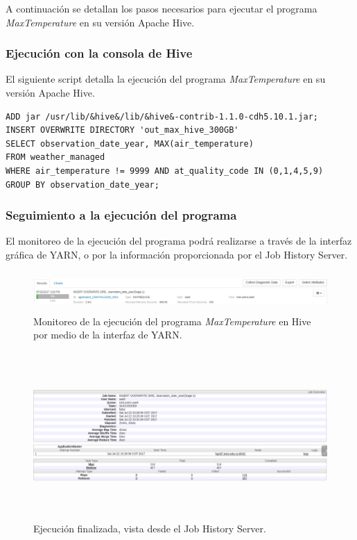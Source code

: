 A continuación se detallan los pasos necesarios para ejecutar el programa \textit{MaxTemperature} en su versión Apache Hive. \\

\subsubsection{Ejecución con la consola de Hive}

El siguiente script detalla la ejecución del programa \textit{MaxTemperature} en su versión Apache Hive.

\begin{lstlisting}[linewidth=\columnwidth,breaklines=true]
ADD jar /usr/lib/&hive&/lib/&hive&-contrib-1.1.0-cdh5.10.1.jar; 
INSERT OVERWRITE DIRECTORY 'out_max_hive_300GB' 
SELECT observation_date_year, MAX(air_temperature) 
FROM weather_managed 
WHERE air_temperature != 9999 AND at_quality_code IN (0,1,4,5,9) 
GROUP BY observation_date_year;
\end{lstlisting} 

\subsubsection{Seguimiento a la ejecución del programa}

El monitoreo de la ejecución del programa podrá realizarse a través de la interfaz gráfica de YARN, o por la información proporcionada por el Job History Server.

\begin{figure}[H]
  \centering
      \includegraphics[width=\textwidth, height=0.6in]{fig/04/06}
  \caption{Monitoreo de la ejecución del programa \textit{MaxTemperature} en Hive por medio de la interfaz de YARN. }
\end{figure}

\begin{figure}[H]
  \centering
      \includegraphics[width=\textwidth, height=2.5in]{fig/04/07}
  \caption{Ejecución finalizada, vista desde el Job History Server.}
\end{figure}


